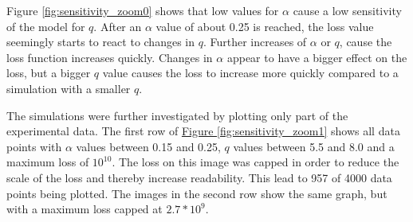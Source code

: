 Figure \ref*{fig:sensitivity_zoom0} shows that low values for $\alpha$ cause a low sensitivity of the model
for $q$. After an $\alpha$ value of about 0.25 is reached, the loss value seemingly starts to react to changes in $q$. Further
increases of $\alpha$ or $q$, cause the loss function increases quickly. Changes in $\alpha$ appear to have a bigger effect
on the loss, but a bigger $q$ value causes the loss to increase more quickly compared to a simulation with a smaller $q$.\newline

The simulations were further investigated by plotting only part of the experimental data.
The first row of \hyperref[fig:sensitivity_zoom1]{Figure \ref*{fig:sensitivity_zoom1}} shows all data points with $\alpha$ values between 0.15
and 0.25, $q$ values between 5.5 and 8.0 and a maximum loss of $10^{10}$. The loss on this image was capped in order to reduce
the scale of the loss and thereby increase readability. This lead to 957 of 4000 data points being plotted. The images in the
second row show the same graph, but with a maximum loss capped at $2.7*10^{9}$.

